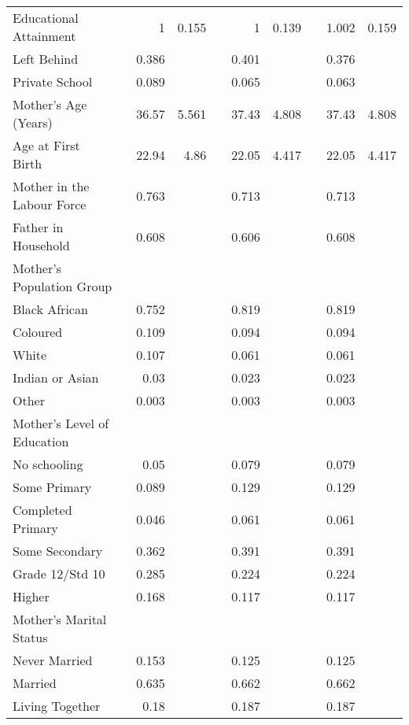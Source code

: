\begin{table}[!htbp]
\begin{tabular}{llrrlrrlrr}
  Educational Attainment &  &     1 & 0.155 &  &     1 & 0.139 &  & 1.002 & 0.159 \\ 
  Left Behind &  & 0.386 &  &  & 0.401 &  &  & 0.376 &  \\ 
  Private School &  & 0.089 &  &  & 0.065 &  &  & 0.063 &  \\ 
  Mother's Age (Years) &  & 36.57 & 5.561 &  & 37.43 & 4.808 &  & 37.43 & 4.808 \\ 
  Age at First Birth &  & 22.94 &  4.86 &  & 22.05 & 4.417 &  & 22.05 & 4.417 \\ 
  Mother in the Labour Force &  & 0.763 &  &  & 0.713 &  &  & 0.713 &  \\ 
  Father in Household &  & 0.608 &  &  & 0.606 &  &  & 0.608 &  \\ 
   \multicolumn{2}{l}{Mother's Population Group} &  &  &  & & & & \\\phantom{M}Black African &  & 0.752 &  &  & 0.819 &  &  & 0.819 &  \\ 
  \phantom{M}Coloured &  & 0.109 &  &  & 0.094 &  &  & 0.094 &  \\ 
  \phantom{M}White &  & 0.107 &  &  & 0.061 &  &  & 0.061 &  \\ 
  \phantom{M}Indian or Asian &  &  0.03 &  &  & 0.023 &  &  & 0.023 &  \\ 
  \phantom{M}Other &  & 0.003 &  &  & 0.003 &  &  & 0.003 &  \\ 
   \multicolumn{2}{l}{Mother's Level of Education} &  &  &  & & & & \\\phantom{M}No schooling &  &  0.05 &  &  & 0.079 &  &  & 0.079 &  \\ 
  \phantom{M}Some Primary &  & 0.089 &  &  & 0.129 &  &  & 0.129 &  \\ 
  \phantom{M}Completed Primary &  & 0.046 &  &  & 0.061 &  &  & 0.061 &  \\ 
  \phantom{M}Some Secondary &  & 0.362 &  &  & 0.391 &  &  & 0.391 &  \\ 
  \phantom{M}Grade 12/Std 10 &  & 0.285 &  &  & 0.224 &  &  & 0.224 &  \\ 
  \phantom{M}Higher &  & 0.168 &  &  & 0.117 &  &  & 0.117 &  \\ 
   \multicolumn{2}{l}{Mother's Marital Status} &  &  &  & & & & \\\phantom{M}Never Married &  & 0.153 &  &  & 0.125 &  &  & 0.125 &  \\ 
  \phantom{M}Married &  & 0.635 &  &  & 0.662 &  &  & 0.662 &  \\ 
  \phantom{M}Living Together &  &  0.18 &  &  & 0.187 &  &  & 0.187 &  \\ 

\end{tabular}
\end{table}
